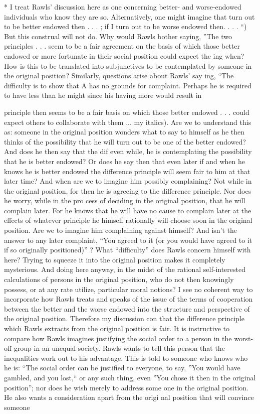 \documentclass[11pt,openany]{book}
\begin{document}
{* I treat Rawls' discussion here as one concerning better- and worse-endowed individuals who know they are so. Alternatively, one might imagine that turn out to be better endowed then . . . ; if I turn out to be worse endowed then. . . . ``) But this construal will not do. Why would Rawls bother saying, ''The two principles . . . seem to be a fair agreement on the basis of which those better endowed or more fortunate in their social position could expect the ing when? How is this to be translated into subjunctives to be contemplated by someone in the original position? Similarly, questions arise about Rawls' say ing, ``The difficulty is to show that A has no grounds for complaint. Perhaps he is required to have less than he might since his having more would result in\par

principle then seems to be a fair basis on which those better endowed . . . could expect others to collaborate with them ... my italics). Are we to understand this as: someone in the original position wonders what to say to himself as he then thinks of the possibility that he will turn out to be one of the better endowed? And does he then say that the dif even while, he is contemplating the possibility that he is better endowed? Or does he say then that even later if and when he knows he is better endowed the difference principle will seem fair to him at that later time? And when are we to imagine him possibly complaining? Not while in the original position, for then he is agreeing to the difference principle. Nor does he worry, while in the pro cess of deciding in the original position, that he will complain later. For he knows that he will have no cause to complain later at the effects of whatever principle he himself rationally will choose soon in the original position. Are we to imagine him complaining against himself? And isn't the answer to any later complaint, ``You agreed to it (or you would have agreed to it if so originally positioned)'' ? What ``difficulty'' does Rawls concern himself with here? Trying to squeeze it into the original position makes it completely mysterious. And doing here anyway, in the midst of the rational self-interested calculations of persons in the original position, who do not then knowingly possess, or at any rate utilize, particular moral notions? I see no coherent way to incorporate how Rawls treats and speaks of the issue of the terms of cooperation between the better and the worse endowed into the structure and perspective of the original position. Therefore my discussion con that the difference principle which Rawls extracts from the original position is fair. It is instructive to compare how Rawls imagines justifying the social order to a person in the worst-off group in an unequal society. Rawls wants to tell this person that the inequalities work out to his advantage. This is told to someone who knows who he is: ``The social order can be justified to everyone, to say, ''You would have gambled, and you lost,`` or any such thing, even ''You chose it then in the original position''; nor does he wish merely to address some one in the original position. He also wants a consideration apart from the origi nal position that will convince someone }
\end{document}
